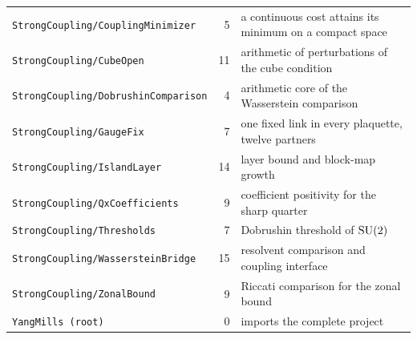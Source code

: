 {\begin{longtable}{@{}>{\raggedright\arraybackslash}p{}r>{\raggedright\arraybackslash}p{}@{}}
\texttt{StrongCoupling/CouplingMinimizer} & 5 & a continuous cost attains its minimum on a compact space\\
\texttt{StrongCoupling/CubeOpen} & 11 & arithmetic of perturbations of the cube condition\\
\texttt{StrongCoupling/DobrushinComparison} & 4 & arithmetic core of the Wasserstein comparison\\
\texttt{StrongCoupling/GaugeFix} & 7 & one fixed link in every plaquette, twelve partners\\
\texttt{StrongCoupling/IslandLayer} & 14 & layer bound and block-map growth\\
\texttt{StrongCoupling/QxCoefficients} & 9 & coefficient positivity for the sharp quarter\\
\texttt{StrongCoupling/Thresholds} & 7 & Dobrushin threshold of $\mathrm{SU}(2)$\\
\texttt{StrongCoupling/WassersteinBridge} & 15 & resolvent comparison and coupling interface\\
\texttt{StrongCoupling/ZonalBound} & 9 & Riccati comparison for the zonal bound\\
\texttt{YangMills (root)} & 0 & imports the complete project\\
\end{longtable}
}

